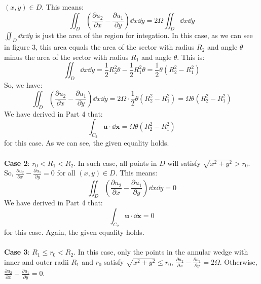 \documentclass{article}
\begin{document}
\begin{enumerate}
\begin{enumerate}
\begin{enumerate}
    \((x,y)\in D\). This means:
    \begin{equation}
      \iint_D \left(\frac{\partial u_2}{\partial x} - \frac{\partial u_1}{\partial y}\right) \dd x\dd y = 2\Omega\iint_D \dd x\dd y
    \end{equation}
    \(\iint_D \dd x\dd y\) is just the area of the region for integation. In this case, as we can see in figure 3,
    this area equals the area of the sector with radius \(R_2\) and angle \(\theta\) minus the area of the sector with radius \(R_1\) and
    angle \(\theta\). This is:
    \begin{equation}
      \iint_D \dd x\dd y = \frac{1}{2}R_2^2\theta - \frac{1}{2}R_1^2\theta = \frac{1}{2}\theta (R_2^2-R_1^2)
    \end{equation}
    So, we have:
    \begin{equation}
      \iint_D \left(\frac{\partial u_2}{\partial x} - \frac{\partial u_1}{\partial y}\right) \dd x\dd y = 2\Omega \cdot \frac{1}{2}\theta (R_2^2-R_1^2) = \Omega\theta(R_2^2 - R_1^2)
    \end{equation}
    We have derived in Part 4 that:
    \begin{equation}
      \int_{C_2} \mathbf{u}\cdot \dd \mathbf{x}= \Omega \theta (R_2^2 - R_1^2)
    \end{equation}
    for this case. As we can see, the given equality holds. \\
    \\
    \textbf{Case 2}:
    \(r_0 <R_1<R_2\). In such case, all points in \(D\) will satisfy \(\sqrt{x^2+y^2} > r_0\).
    So, \(\frac{\partial u_2}{\partial x} - \frac{\partial u_1}{\partial y} = 0\) for all
    \((x,y)\in D\). This means:
    \begin{equation}
      \iint_D \left(\frac{\partial u_2}{\partial x} - \frac{\partial u_1}{\partial y}\right) \dd x\dd y = 0
    \end{equation}
    We have derived in Part 4 that:
    \begin{equation}
      \int_{C_2} \mathbf{u}\cdot \dd \mathbf{x}= 0
    \end{equation}
    for this case. Again, the given equality holds.\\
    \\
    \textbf{Case 3}: \(R_1\le r_0 <R_2\). In this case, only the points in the annular wedge with inner and outer radii
    \(R_1\) and \(r_0\) satisfy \(\sqrt{x^2+y^2} \le r_0\), \(\frac{\partial u_2}{\partial x} - \frac{\partial u_1}{\partial y} = 2\Omega\). Otherwise, \(\frac{\partial u_2}{\partial x} - \frac{\partial u_1}{\partial y} = 0\).

\end{enumerate}
\end{enumerate}
\end{enumerate}
\end{document}
